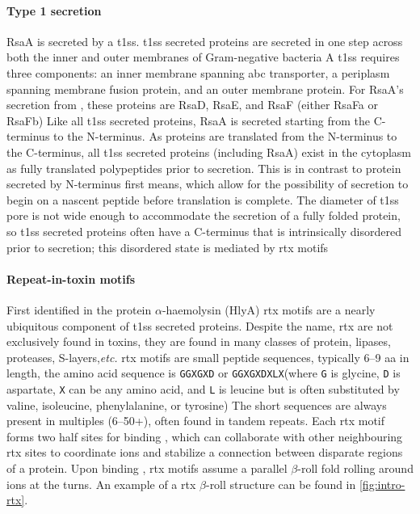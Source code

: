 \paragraph{Type 1 secretion} RsaA is secreted by a \ac{t1ss}. \Ac{t1ss} secreted proteins are secreted in one step across both the inner and outer membranes of Gram-negative
bacteria A \ac{t1ss} requires three components: an inner membrane spanning \ac{abc} transporter, a periplasm spanning membrane fusion protein, and an
outer membrane protein. For RsaA's secretion from \caulobacter, these proteins are RsaD, RsaE, and RsaF (either RsaFa or RsaFb) Like all
\ac{t1ss} secreted proteins, RsaA is secreted starting from the C-terminus to the N-terminus. As proteins are translated from the N-terminus to the C-terminus, all \ac{t1ss}
secreted proteins (including RsaA) exist in the cytoplasm as fully translated polypeptides prior to secretion. This is in contrast to protein secreted by N-terminus first means,
which allow for the possibility of secretion to begin on a nascent peptide before translation is complete. The diameter of \ac{t1ss} pore is not wide enough to accommodate the
secretion of a fully folded protein, so \ac{t1ss} secreted proteins often have a C-terminus that is intrinsically disordered prior to secretion; this disordered state is mediated
by \ac{rtx} motifs

  \paragraph{Repeat-in-toxin motifs} \label{sec:repeat-toxin-motifs} First identified in the \ecoli protein $\alpha$-haemolysin (HlyA) \ac{rtx}
motifs are a nearly ubiquitous component of \ac{t1ss} secreted proteins. Despite the name, \acl{rtx} are not exclusively found in toxins, they are found in many classes of protein,
lipases, proteases, S-layers,\textit{etc.} \ac{rtx} motifs are small peptide sequences, typically 6--9 \ac{aa} in length, the amino acid sequence is
\texttt{GGXGXD} or \texttt{GGXGXDXLX}(where \texttt{G} is glycine, \texttt{D} is aspartate, \texttt{X} can be any amino acid, and \texttt{L} is
leucine but is often substituted by valine, isoleucine, phenylalanine, or tyrosine) The short sequences are always present in
multiples (6--50+), often found in tandem repeats. Each \ac{rtx} motif forms two half sites for binding , which can collaborate with other neighbouring \ac{rtx} sites to
coordinate ions and stabilize a connection between disparate regions of a protein. Upon binding , \ac{rtx} motifs assume a parallel $\beta$-roll
fold rolling around  ions at the turns. An example of a \ac{rtx} $\beta$-roll structure can be found in \cref{fig:intro-rtx}.

